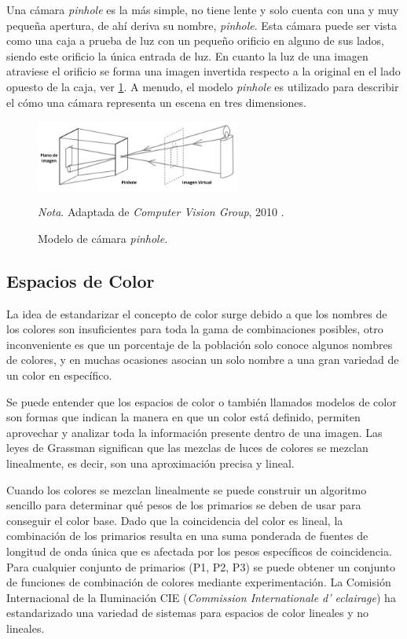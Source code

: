  Una cámara \textit{pinhole} es la más simple, no tiene lente y solo cuenta con una y muy pequeña apertura, de ahí deriva su nombre, \textit{pinhole}. Esta cámara puede ser vista como una caja a prueba de luz con un pequeño orificio en alguno de sus lados, siendo este orificio la única entrada de luz. En cuanto la luz de una imagen atraviese el orificio se forma una imagen invertida respecto a la original en el lado opuesto de la caja, ver \ref{fig:pinhole_camera}. A menudo, el modelo \textit{pinhole} es utilizado para describir el cómo una cámara representa un escena en tres dimensiones.
 \begin{figure}
    \centering
    \includegraphics[width=0.6\textwidth]{Figures/Figures_Cap02/pinhole_camera.png}
    \caption{Modelo de cámara \textit{pinhole}.}
    \textit{Nota}. Adaptada de \textit{Computer Vision Group}, 2010 \cite{ComputerVisionGroup}.
    \label{fig:pinhole_camera}
\end{figure}

\subsection{Espacios de Color} \label{sub:espacios_de_color}

La idea de estandarizar el concepto de color surge debido a que los nombres de los colores son insuficientes para toda la gama de combinaciones posibles, otro inconveniente es que un porcentaje de la población solo conoce algunos nombres de colores, y en muchas ocasiones asocian un solo nombre a una gran variedad de un color en específico. 

Se puede entender que los espacios de color o también llamados modelos de color son formas que indican la manera en que un color está definido, permiten aprovechar y analizar toda la información presente dentro de una imagen. Las leyes de Grassman significan que las mezclas de luces de colores se mezclan linealmente, es decir, son una aproximación precisa y lineal\cite{forsyth2011computer}.

Cuando los colores se mezclan linealmente se puede construir un algoritmo sencillo para determinar qué pesos de los primarios se deben de usar para conseguir el color base. Dado que la coincidencia del color es lineal, la combinación de los primarios resulta en una suma ponderada de fuentes de longitud de onda única que es afectada por los pesos específicos de coincidencia. Para cualquier conjunto de primarios (P1, P2, P3) se puede obtener un conjunto de funciones de combinación de colores mediante experimentación\cite{forsyth2011computer}. La Comisión Internacional de la Iluminación CIE (\textit{Commission Internationale d’ eclairage}) ha estandarizado una variedad de sistemas para espacios de color lineales y no lineales.

